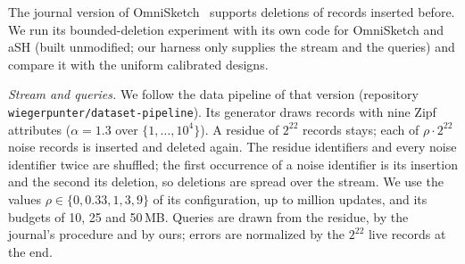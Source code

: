 \documentclass[sigconf,review,anonymous]{acmart}
\newcommand{\omni}{OmniSketch\xspace}
\begin{document}
\begin{table}[t]
\centering\footnotesize\setlength{\tabcolsep}{3pt}
\caption{Bounded deletions in the setting of the journal version's code: residue of $2^{22}$ records
(9 Zipf attributes, $\alpha=1.3$), each of $\rho\cdot2^{22}$ further records inserted and deleted again;
normalized absolute error w.r.t.\ the live records at the end (mean of 3 seeds). \omni and aSH: the
journal version's code, unmodified.}
\label{tab:deletes}

\end{table}

The journal version of \omni~\cite{omni-vldbj} supports deletions of records inserted before. We run its
bounded-deletion experiment with its own code for \omni and aSH (built unmodified; our harness only
supplies the stream and the queries) and compare it with the uniform calibrated designs.

\emph{Stream and queries.} We follow the data pipeline of that version (repository
\texttt{wiegerpunter/}\allowbreak\texttt{dataset-pipeline}). Its generator draws records with nine Zipf attributes
($\alpha=1.3$ over $\{1,\dots,10^4\}$). A residue of $2^{22}$ records stays; each of $\rho\cdot2^{22}$
noise records is inserted and deleted again. The residue identifiers and every noise identifier twice
are shuffled; the first occurrence of a noise identifier is its insertion and the second its deletion,
so deletions are spread over the stream. We use the values $\rho\in\{0,0.33,1,3,9\}$ of its
configuration, up to \NumDelUpdatesNine{} million updates, and its budgets of 10, 25 and 50\,MB. Queries
are drawn from the residue, by the journal's procedure and by ours; errors are normalized by the
$2^{22}$ live records at the end.
\end{document}

